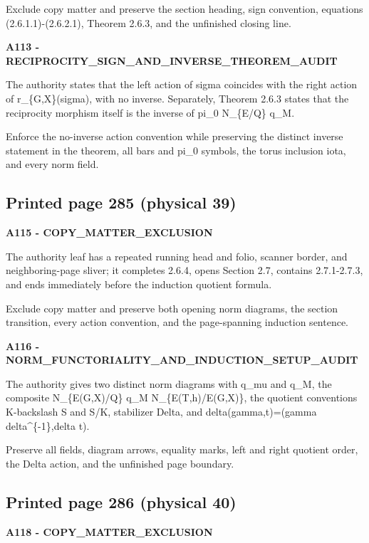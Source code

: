 \documentclass[10pt,a4paper]{article}
\begin{document}
Exclude copy matter and preserve the section heading, sign convention, equations (2.6.1.1)-(2.6.2.1), Theorem 2.6.3, and the unfinished closing line.

\textbf{A113 - RECIPROCITY\_SIGN\_AND\_INVERSE\_THEOREM\_AUDIT}

The authority states that the left action of sigma coincides with the right action of r\_\{G,X\}(sigma), with no inverse. Separately, Theorem 2.6.3 states that the reciprocity morphism itself is the inverse of pi\_0 N\_\{E/Q\} q\_M.

Enforce the no-inverse action convention while preserving the distinct inverse statement in the theorem, all bars and pi\_0 symbols, the torus inclusion iota, and every norm field.

\subsection{Printed page 285 (physical 39)}

\textbf{A115 - COPY\_MATTER\_EXCLUSION}

The authority leaf has a repeated running head and folio, scanner border, and neighboring-page sliver; it completes 2.6.4, opens Section 2.7, contains 2.7.1-2.7.3, and ends immediately before the induction quotient formula.

Exclude copy matter and preserve both opening norm diagrams, the section transition, every action convention, and the page-spanning induction sentence.

\textbf{A116 - NORM\_FUNCTORIALITY\_AND\_INDUCTION\_SETUP\_AUDIT}

The authority gives two distinct norm diagrams with q\_mu and q\_M, the composite N\_\{E(G,X)/Q\} q\_M N\_\{E(T,h)/E(G,X)\}, the quotient conventions K-backslash S and S/K, stabilizer Delta, and delta(gamma,t)=(gamma delta\^{}\{-1\},delta t).

Preserve all fields, diagram arrows, equality marks, left and right quotient order, the Delta action, and the unfinished page boundary.

\subsection{Printed page 286 (physical 40)}

\textbf{A118 - COPY\_MATTER\_EXCLUSION}
\end{document}
